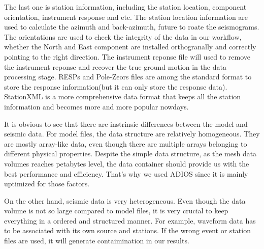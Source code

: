 The last one is station information, including the station location, component orientation,
instrument response and etc. The station location information are used to calculate the 
azimuth and back-azimuth, future to roate the seismograms. The orientations are used
to check the integrity of the data in our workflow, whether the North and East component are installed
orthogranally and correctly pointing to the right direction. The instrument reponse
file will used to remove the instrument reponse and recover the true ground motion
in the data processing stage. RESPs and Pole-Zeors files are among the standard
format to store the response information(but it can only store the response data).
StationXML is a more comprehensive data format that keeps all the station information
and becomes more and more popular nowdays.

It is obvious to see that there are instrinsic differences between the model and seismic data.
For model files, the data structure are relatively homogeneous. They are mostly
array-like data, even though there are multiple arrays belonging to different physical
properties. Despite the simple data structure, as the mesh data volumes reaches petabytes level,
the data container should provide us with the best performance
and efficiency. That's why we used ADIOS since it is mainly uptimized for those
factors.

On the other hand, seismic data is very heterogeneous. Even
though the data volume is not so large compared to model files, it is very crucial to
keep everything in a ordered and structured manner. For example, 
waveform data has to be associated with its own source and stations. If the wrong
event or station files are used, it will generate contaimination in our results.


